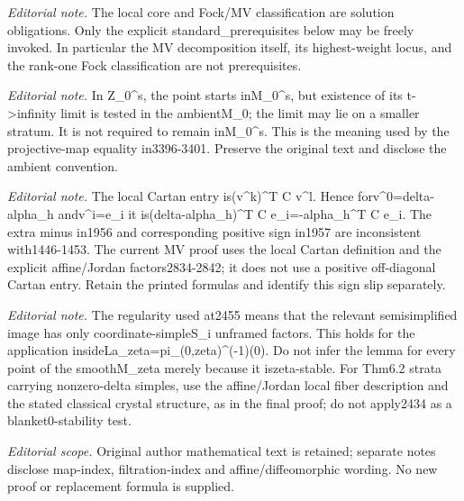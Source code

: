 \documentclass[10pt,a4paper]{amsart}
\theoremstyle{definition}
\numberwithin{equation}{section}
\begin{document}
\noindent\textit{Editorial note.} The local core and Fock/MV classification are solution obligations. Only the explicit standard\_prerequisites below may be freely invoked. In particular the MV decomposition itself, its highest-weight locus, and the rank-one Fock classification are not prerequisites.\par\medskip
\noindent\textit{Editorial note.} In Z\_0\textasciicircum{}s, the point starts inM\_0\textasciicircum{}s, but existence of its t->infinity limit is tested in the ambientM\_0; the limit may lie on a smaller stratum. It is not required to remain inM\_0\textasciicircum{}s. This is the meaning used by the projective-map equality in3396-3401. Preserve the original text and disclose the ambient convention.\par\medskip
\noindent\textit{Editorial note.} The local Cartan entry is(v\textasciicircum{}k)\textasciicircum{}T C v\textasciicircum{}l. Hence forv\textasciicircum{}0=delta-alpha\_h andv\textasciicircum{}i=e\_i it is(delta-alpha\_h)\textasciicircum{}T C e\_i=-alpha\_h\textasciicircum{}T C e\_i. The extra minus in1956 and corresponding positive sign in1957 are inconsistent with1446-1453. The current MV proof uses the local Cartan definition and the explicit affine/Jordan factors2834-2842; it does not use a positive off-diagonal Cartan entry. Retain the printed formulas and identify this sign slip separately.\par\medskip
\noindent\textit{Editorial note.} The regularity used at2455 means that the relevant semisimplified image has only coordinate-simpleS\_i unframed factors. This holds for the application insideLa\_zeta=pi\_(0,zeta)\textasciicircum{}(-1)(0). Do not infer the lemma for every point of the smoothM\_zeta merely because it iszeta-stable. For Thm6.2 strata carrying nonzero-delta simples, use the affine/Jordan local fiber description and the stated classical crystal structure, as in the final proof; do not apply2434 as a blanket0-stability test.\par\medskip
\noindent\textit{Editorial scope.} Original author mathematical text is retained; separate notes disclose map-index, filtration-index and affine/diffeomorphic wording. No new proof or replacement formula is supplied.\par\medskip
\end{document}
